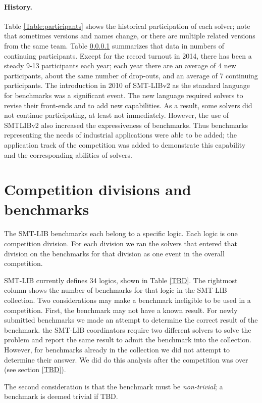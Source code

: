 \documentclass[twosize,11pt]{article}
\begin{document}
\paragraph{History.} Table \ref{Table:participants} shows the
 historical participation of each solver; note that sometimes versions and names change, or there are multiple related versions from the same team. 
Table \ref{} summarizes that data in numbers of continuing participants. Except for the record turnout in
 2014, there has been a steady 9-13 participants each year; each year there are an average of 4 new
 participants, about the same number of drop-outs, and an average of 7 continuing participants. 
The introduction in 2010 of SMT-LIBv2 as the standard language for benchmarks was a significant event. The new language required solvers to revise their front-ends and to add new capabilities.
As a result, some solvers did not continue participating, at least not immediately. However, the use of SMTLIBv2 also increased the expressiveness of benchmarks. Thus benchmarks representing the needs of industrial applications were able to be added; 
the application track of the competition was added to demonstrate this capability and the corresponding abilities of solvers.

\section{Competition divisions and benchmarks}
\label{sec:benchmarks}

The SMT-LIB benchmarks each belong to a specific logic. Each logic is one competition division. For each division we ran the solvers that entered that division on the benchmarks for that division as one event in the overall competition.

SMT-LIB currently defines 34 logics, shown in Table \ref{TBD}. The rightmost column shows the number of benchmarks for that logic in the SMT-LIB collection. Two considerations may make a benchmark ineligible to be used in a competition. First, the benchmark may not have a known result. For newly submitted benchmarks
we made an attempt to determine the correct result of the benchmark. the SMT-LIB coordinators require two 
different solvers to solve the problem and report the same result to admit the benchmark into the collection.
However, for benchmarks already in the collection we did not attempt to determine their answer. We did do this analysis after the competition was over (see section \ref{TBD}).

The second consideration is that the benchmark must be \textit{non-trivial}; a benchmark is deemed trivial if TBD.
\end{document}
